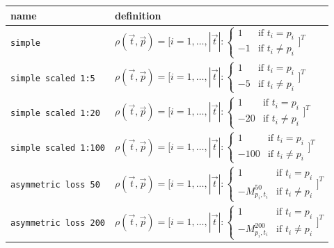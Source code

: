 \documentclass[twoside,11pt]{article}
\begin{document}
\begin{longtabu}{p{3cm}X}
    name &definition \\ \hline
    \texttt{simple}
    &$\rho(\vec{t}, \vec{p}) = \Bigg[
      i=1,\dots,|\vec{t}|:
      \begin{cases}
        1  &\text{if } t_i = p_i \\
        -1 &\text{if } t_i \neq p_i
      \end{cases} \Bigg]^T$\\

    \texttt{simple scaled 1:5}
    &$\rho(\vec{t}, \vec{p}) = \Bigg[
      i=1,\dots,|\vec{t}|:
      \begin{cases}
        1  &\text{if } t_i = p_i \\
        -5 &\text{if } t_i \neq p_i
      \end{cases} \Bigg]^T$\\

    \texttt{simple scaled 1:20}
    &$\rho(\vec{t}, \vec{p}) = \Bigg[
      i=1,\dots,|\vec{t}|:
      \begin{cases}
        1  &\text{if } t_i = p_i \\
        -20 &\text{if } t_i \neq p_i
      \end{cases} \Bigg]^T$\\

    \texttt{simple scaled 1:100}
    &$\rho(\vec{t}, \vec{p}) = \Bigg[
      i=1,\dots,|\vec{t}|:
      \begin{cases}
        1  &\text{if } t_i = p_i \\
        -100 &\text{if } t_i \neq p_i
      \end{cases} \Bigg]^T$\\

    \texttt{asymmetric loss 50}
    &$\rho(\vec{t}, \vec{p}) = \Bigg[
      i=1,\dots,|\vec{t}|:
      \begin{cases}
        1  &\text{if } t_i = p_i \\
        -M^{50}_{p_i,t_i} &\text{if } t_i \neq p_i
      \end{cases} \Bigg]^T$\\

    \texttt{asymmetric loss 200}
    &$\rho(\vec{t}, \vec{p}) = \Bigg[
      i=1,\dots,|\vec{t}|:
      \begin{cases}
        1  &\text{if } t_i = p_i \\
        -M^{200}_{p_i,t_i} &\text{if } t_i \neq p_i
      \end{cases} \Bigg]^T$\\


\end{longtabu}
\end{document}
